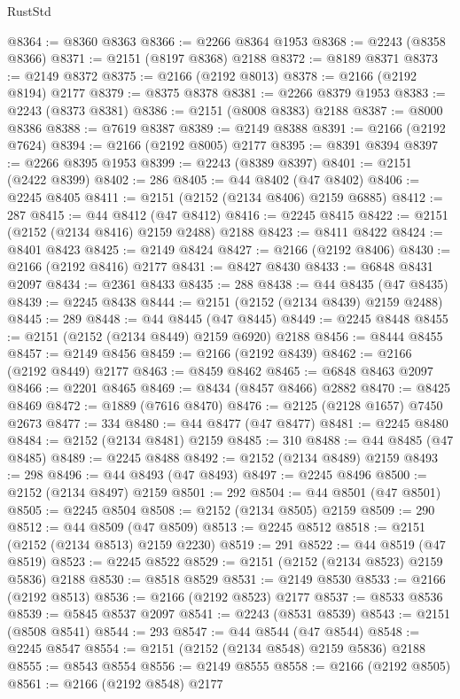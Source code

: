 \begin{lexlean}{RustStd}
\begin{coremodule}
@8364 := @8360 @8363
@8366 := @2266 @8364 @1953
@8368 := @2243 (@8358 @8366)
@8371 := @2151 (@8197 @8368) @2188
@8372 := @8189 @8371
@8373 := @2149 @8372
@8375 := @2166 (@2192 @8013)
@8378 := @2166 (@2192 @8194) @2177
@8379 := @8375 @8378
@8381 := @2266 @8379 @1953
@8383 := @2243 (@8373 @8381)
@8386 := @2151 (@8008 @8383) @2188
@8387 := @8000 @8386
@8388 := @7619 @8387
@8389 := @2149 @8388
@8391 := @2166 (@2192 @7624)
@8394 := @2166 (@2192 @8005) @2177
@8395 := @8391 @8394
@8397 := @2266 @8395 @1953
@8399 := @2243 (@8389 @8397)
@8401 := @2151 (@2422 @8399)
@8402 := 286
@8405 := @44 @8402 (@47 @8402)
@8406 := @2245 @8405
@8411 := @2151 (@2152 (@2134 @8406) @2159 @6885)
@8412 := 287
@8415 := @44 @8412 (@47 @8412)
@8416 := @2245 @8415
@8422 := @2151 (@2152 (@2134 @8416) @2159 @2488) @2188
@8423 := @8411 @8422
@8424 := @8401 @8423
@8425 := @2149 @8424
@8427 := @2166 (@2192 @8406)
@8430 := @2166 (@2192 @8416) @2177
@8431 := @8427 @8430
@8433 := @6848 @8431 @2097
@8434 := @2361 @8433
@8435 := 288
@8438 := @44 @8435 (@47 @8435)
@8439 := @2245 @8438
@8444 := @2151 (@2152 (@2134 @8439) @2159 @2488)
@8445 := 289
@8448 := @44 @8445 (@47 @8445)
@8449 := @2245 @8448
@8455 := @2151 (@2152 (@2134 @8449) @2159 @6920) @2188
@8456 := @8444 @8455
@8457 := @2149 @8456
@8459 := @2166 (@2192 @8439)
@8462 := @2166 (@2192 @8449) @2177
@8463 := @8459 @8462
@8465 := @6848 @8463 @2097
@8466 := @2201 @8465
@8469 := @8434 (@8457 @8466) @2882
@8470 := @8425 @8469
@8472 := @1889 (@7616 @8470)
@8476 := @2125 (@2128 @1657) @7450 @2673
@8477 := 334
@8480 := @44 @8477 (@47 @8477)
@8481 := @2245 @8480
@8484 := @2152 (@2134 @8481) @2159
@8485 := 310
@8488 := @44 @8485 (@47 @8485)
@8489 := @2245 @8488
@8492 := @2152 (@2134 @8489) @2159
@8493 := 298
@8496 := @44 @8493 (@47 @8493)
@8497 := @2245 @8496
@8500 := @2152 (@2134 @8497) @2159
@8501 := 292
@8504 := @44 @8501 (@47 @8501)
@8505 := @2245 @8504
@8508 := @2152 (@2134 @8505) @2159
@8509 := 290
@8512 := @44 @8509 (@47 @8509)
@8513 := @2245 @8512
@8518 := @2151 (@2152 (@2134 @8513) @2159 @2230)
@8519 := 291
@8522 := @44 @8519 (@47 @8519)
@8523 := @2245 @8522
@8529 := @2151 (@2152 (@2134 @8523) @2159 @5836) @2188
@8530 := @8518 @8529
@8531 := @2149 @8530
@8533 := @2166 (@2192 @8513)
@8536 := @2166 (@2192 @8523) @2177
@8537 := @8533 @8536
@8539 := @5845 @8537 @2097
@8541 := @2243 (@8531 @8539)
@8543 := @2151 (@8508 @8541)
@8544 := 293
@8547 := @44 @8544 (@47 @8544)
@8548 := @2245 @8547
@8554 := @2151 (@2152 (@2134 @8548) @2159 @5836) @2188
@8555 := @8543 @8554
@8556 := @2149 @8555
@8558 := @2166 (@2192 @8505)
@8561 := @2166 (@2192 @8548) @2177

\end{coremodule}
\end{lexlean}
